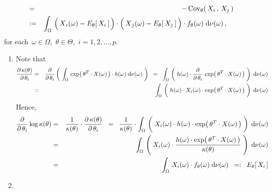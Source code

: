 \begin{theorem}
\begin{enumerate}
\begin{eqnarray*}
	\\
	& = &
		-\,\overset{{\color{white}.}}{\Cov}_{\theta}\!\left(\,X_{i}\,,\,X_{j}\,\right)
	\\
	& := &
		\int_{\Omega}\,
			\left(\,\overset{{\color{white}.}}{X}_{i}(\omega) - E_{\theta}\!\left[\,X_{i}\,\right]\,\right)
			\cdot
			\left(\,\overset{{\color{white}.}}{X}_{j}(\omega) - E_{\theta}\!\left[\,X_{j}\,\right]\,\right)
			\cdot
			f_{\theta}(\omega)
		\;\d\nu(\omega)\,,
	\quad
	\end{eqnarray*}	
	for each \,$\omega\in\Omega$, \,$\theta\in\Theta$, \,$i = 1,2,\ldots,p$.
\end{enumerate}
\end{theorem}
\proof
\begin{enumerate}
\item
	Note that
	\begin{eqnarray*}
	\dfrac{\partial\,\kappa(\theta)}{\partial\,\theta_{i}}
	& = &
		\dfrac{\partial}{\partial\,\theta_{i}}
		\left(\;
			\int_{\Omega}\,
			\exp\!\left(\,\theta^{T}\cdot X(\omega)\,\right)\cdot h(\omega)
			\;\d\nu(\omega)
		\;\right)
	\;\; = \;\;
		\int_{\Omega}\,
			\left(\;
			h(\omega)
			\cdot
			\dfrac{\partial}{\partial\,\theta_{i}}\,
			\exp\!\left(\,\theta^{T}\cdot X(\omega)\,\right)
			\;\right)
		\;\d\nu(\omega)
	\\
	&=&
		\int_{\Omega}\,
			\left(\;
			\overset{{\color{white}-}}{h}(\omega)
			\cdot
			X_{i}(\omega)
			\cdot
			\exp\!\left(\,\theta^{T}\cdot X(\omega)\,\right)
			\;\right)
		\;\d\nu(\omega)
	\end{eqnarray*}
	Hence,
	\begin{eqnarray*}
	\dfrac{\partial}{\partial\,\theta_{i}} \log \kappa(\theta)
	&=&
		\dfrac{1}{\kappa(\theta)} \cdot \dfrac{\partial\,\kappa(\theta)}{\partial\,\theta_{i}}
	\;\; = \;\;
		\dfrac{1}{\kappa(\theta)}
		\cdot
		\int_{\Omega}\,
			\left(\;
			X_{i}(\omega)
			\cdot
			\overset{{\color{white}-}}{h}(\omega)
			\cdot
			\exp\!\left(\,\theta^{T}\cdot X(\omega)\,\right)
			\;\right)
		\;\d\nu(\omega)
	\\
	& = &
		\int_{\Omega}\,
			\left(\;
			X_{i}(\omega)
			\cdot
			\dfrac{
				h(\omega) \cdot \exp\!\left(\,\theta^{T}\cdot X(\omega)\,\right)
				}{
				\kappa(\theta)
				}
			\;\right)
		\;\d\nu(\omega)
	\\
	& = &
		\int_{\Omega}\,
			X_{i}(\omega) \cdot f_{\theta}(\omega)
		\;\d\nu(\omega)
	\;\; =: \;\;
		E_{\theta}\!\left[\,X_{i}\,\right]
	\end{eqnarray*}
\item

\end{enumerate}
